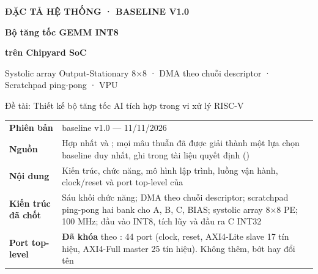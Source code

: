 \thispagestyle{empty}

\vspace*{3cm}
{\headfont\bfseries\small\color{brand}\MakeUppercase{Đặc tả hệ thống · Baseline v1.0}\par}
\vspace{0.6cm}
\hspace{0.45cm}\begin{minipage}[t]{0.9\linewidth}
{\headfont\bfseries\fontsize{30}{36}\selectfont\color{brand}Bộ tăng tốc GEMM INT8\par}
\vspace{4pt}
{\headfont\bfseries\fontsize{30}{36}\selectfont\color{brand}trên Chipyard SoC\par}
\vspace{10pt}
{\large\color{ink}Systolic array Output-Stationary 8×8 · DMA theo chuỗi descriptor · Scratchpad ping-pong · VPU\par}
\vspace{4pt}
{\normalsize\color{muted}Đề tài: Thiết kế bộ tăng tốc AI tích hợp trong vi xử lý RISC-V\par}
\end{minipage}

\vspace{2cm}
\begingroup\small
\begin{tabular}{@{}L{0.18}L{0.8}@{}}
\toprule
\textbf{Phiên bản} & baseline v1.0 — 11/11/2026 \\
\textbf{Nguồn} & Hợp nhất  và ; mọi mâu thuẫn đã được giải thành một lựa chọn baseline duy nhất, ghi trong tài liệu quyết định () \\
\textbf{Nội dung} & Kiến trúc, chức năng, mô hình lập trình, luồng vận hành, clock/reset và port top-level của  \\
\textbf{Kiến trúc đã chốt} & Sáu khối chức năng; DMA theo chuỗi descriptor; scratchpad ping-pong hai bank cho A, B, C, BIAS; systolic array 8×8 PE;  100 MHz; đầu vào INT8, tích lũy và đầu ra C INT32 \\
\textbf{Port top-level} & \textbf{Đã khóa} theo : 44 port (clock, reset, AXI4-Lite slave 17 tín hiệu, AXI4-Full master 25 tín hiệu). Không thêm, bớt hay đổi tên \\
\bottomrule
\end{tabular}
\endgroup

\clearpage
\tableofcontents
\clearpage
